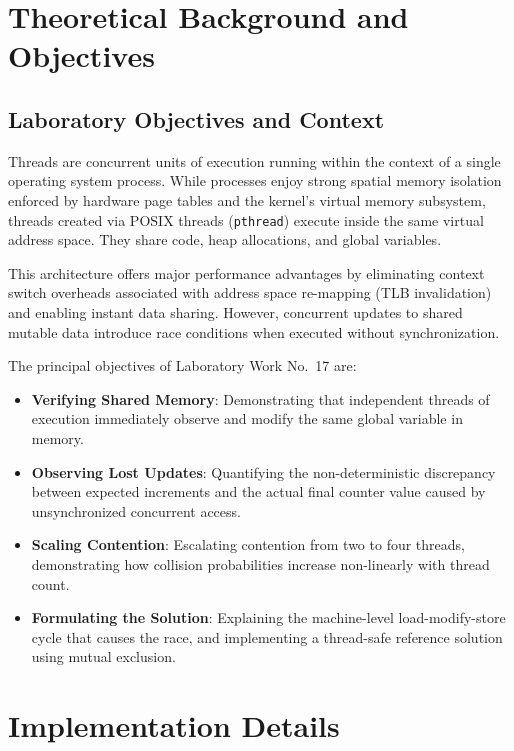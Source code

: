 \documentclass[12pt,a4paper]{article}
\begin{document}
\section{Theoretical Background and Objectives}

\subsection{Laboratory Objectives and Context}
Threads are concurrent units of execution running within the context of a single operating system process. While processes enjoy strong spatial memory isolation enforced by hardware page tables and the kernel's virtual memory subsystem, threads created via POSIX threads (\texttt{pthread}) execute inside the same virtual address space. They share code, heap allocations, and global variables.

This architecture offers major performance advantages by eliminating context switch overheads associated with address space re-mapping (TLB invalidation) and enabling instant data sharing. However, concurrent updates to shared mutable data introduce race conditions when executed without synchronization.

The principal objectives of Laboratory Work No.~17 are:
\begin{itemize}
    \item \textbf{Verifying Shared Memory}: Demonstrating that independent threads of execution immediately observe and modify the same global variable in memory.
    \item \textbf{Observing Lost Updates}: Quantifying the non-deterministic discrepancy between expected increments and the actual final counter value caused by unsynchronized concurrent access.
    \item \textbf{Scaling Contention}: Escalating contention from two to four threads, demonstrating how collision probabilities increase non-linearly with thread count.
    \item \textbf{Formulating the Solution}: Explaining the machine-level load-modify-store cycle that causes the race, and implementing a thread-safe reference solution using mutual exclusion.
\end{itemize}

\section{Implementation Details}
\end{document}
